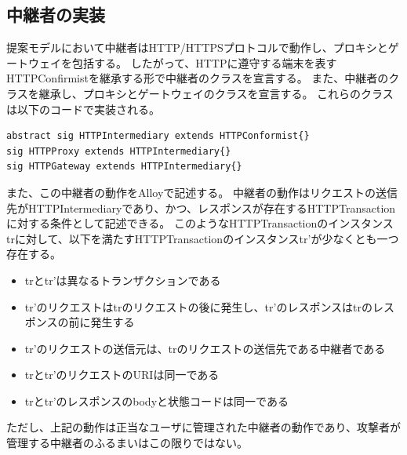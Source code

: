 \documentclass[journal]{IEEEtran}
\begin{document}
\subsection{中継者の実装}
提案モデルにおいて中継者はHTTP/HTTPSプロトコルで動作し、プロキシとゲートウェイを包括する。
したがって、HTTPに遵守する端末を表すHTTPConfirmistを継承する形で中継者のクラスを宣言する。
また、中継者のクラスを継承し、プロキシとゲートウェイのクラスを宣言する。
これらのクラスは以下のコードで実装される。

\begin{lstlisting}[caption=中継者のクラス, label=code:IntermediaryClass]
abstract sig HTTPIntermediary extends HTTPConformist{}
sig HTTPProxy extends HTTPIntermediary{}
sig HTTPGateway extends HTTPIntermediary{}
\end{lstlisting}

また、この中継者の動作をAlloyで記述する。
中継者の動作はリクエストの送信先がHTTPIntermediaryであり、かつ、レスポンスが存在するHTTPTransactionに対する条件として記述できる。
このようなHTTPTransactionのインスタンスtrに対して、以下を満たすHTTPTransactionのインスタンスtr'が少なくとも一つ存在する。
\begin{itemize}
\item trとtr'は異なるトランザクションである
\item tr'のリクエストはtrのリクエストの後に発生し、tr'のレスポンスはtrのレスポンスの前に発生する
\item tr'のリクエストの送信元は、trのリクエストの送信先である中継者である
\item trとtr'のリクエストのURIは同一である
\item trとtr'のレスポンスのbodyと状態コードは同一である
\end{itemize}
ただし、上記の動作は正当なユーザに管理された中継者の動作であり、攻撃者が管理する中継者のふるまいはこの限りではない。
\end{document}
